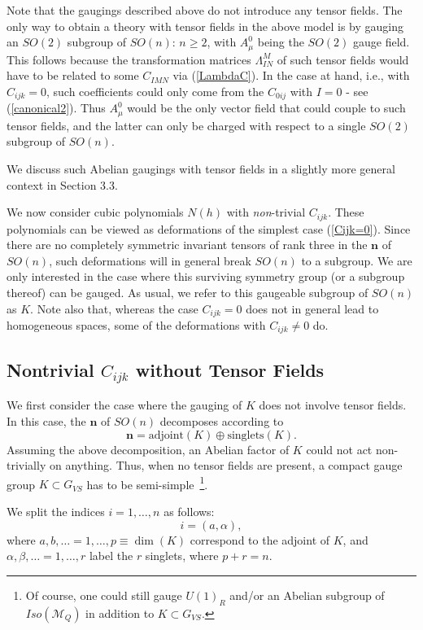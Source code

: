 \documentclass[a4paper,11pt]{article}
\newcommand{\M}{\ensuremath{\mathcal{M}}}
\begin{document}
Note that the gaugings described above do not introduce any tensor fields.
The only way to obtain a theory with tensor fields in the above model is
by gauging an $SO(2)$ subgroup of $SO(n)$: $n \geq 2$, with $A_{\mu}^{0}$
being the $SO(2)$ gauge field.  This follows because the transformation
matrices $\Lambda_{IN}^M$ of such tensor fields would have to be related
to some $C_{IMN}$ via (\ref{LambdaC}). In the case at hand, i.e., with
$C_{ijk}=0$, such coefficients could only come from the $C_{0ij}$ with
$I=0$ - see (\ref{canonical2}). Thus $A_{\mu}^0$ would be the only vector
field that could couple to such tensor fields, and the latter can only be
charged with respect to a single $SO(2)$ subgroup of $SO(n)$. 

We discuss such Abelian gaugings with tensor fields in a slightly more
general context in Section 3.3. 



We now consider cubic polynomials $N(h)$ with \emph{non}-trivial
$C_{ijk}$. These polynomials can be viewed as deformations of the simplest
case (\ref{Cijk=0}). Since there are no completely symmetric invariant
tensors of rank three in the $\mathbf{n}$ of $SO(n)$, such deformations
will in general break $SO(n)$ to a subgroup. We are only interested in the
case where this surviving symmetry group (or a subgroup thereof) can be
gauged. As usual, we refer to this gaugeable subgroup of $SO(n)$ as $K$.
Note also that, whereas the case $C_{ijk}=0$ does not in general lead to
homogeneous spaces, some of the deformations with $C_{ijk}\neq 0$ do. 

\subsection{Nontrivial $C_{ijk}$ without Tensor Fields}

We first consider the case where the gauging of $K$ does not
involve tensor fields. In this case, the $\mathbf{n}$ of $SO(n)$
decomposes according to
\begin{displaymath}
\mathbf{n}=\textrm{adjoint}(K)\oplus \textrm{singlets}(K).
\end{displaymath}
Assuming the above decomposition, an Abelian factor of $K$ could
not act non-trivially on anything. Thus, when no tensor fields are
present, a compact gauge group
$K\subset G_{VS}$ has to be semi-simple~\footnote{Of course, one
could still gauge
$U(1)_R$ and/or an Abelian  subgroup of $Iso(\M_Q)$ in addition to
$K\subset G_{VS}$.}.

We split the indices $i=1,\ldots, n$ as follows:
\begin{equation}
i=(a,\alpha),
\end{equation}
where $a,b,\ldots=1,\ldots, p\equiv \dim{(K)}$ correspond to the
adjoint of $K$, and $\alpha,\beta,\ldots=1,\ldots,r$ label the $r$
singlets, where $p+r=n$.
\end{document}
